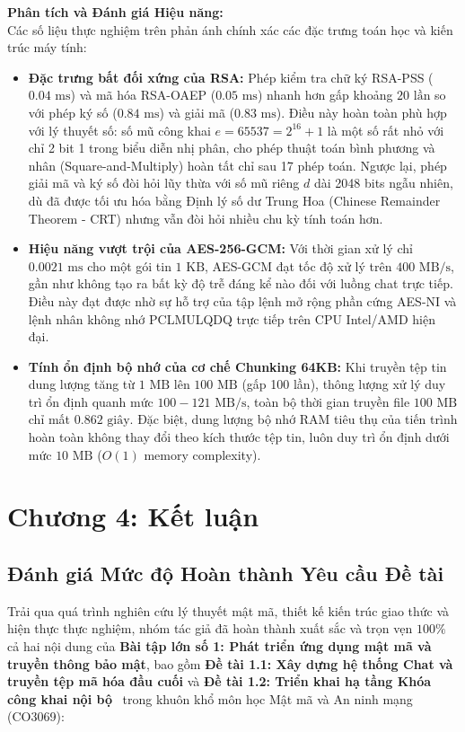 \documentclass[a4paper,12pt]{article}
\begin{document}
\textbf{Phân tích và Đánh giá Hiệu năng:}\\
Các số liệu thực nghiệm trên phản ánh chính xác các đặc trưng toán học và kiến trúc máy tính:
\begin{itemize}
    \item \textbf{Đặc trưng bất đối xứng của RSA:} Phép kiểm tra chữ ký RSA-PSS ($0.04\text{ ms}$) và mã hóa RSA-OAEP ($0.05\text{ ms}$) nhanh hơn gấp khoảng $20\text{ lần}$ so với phép ký số ($0.84\text{ ms}$) và giải mã ($0.83\text{ ms}$). Điều này hoàn toàn phù hợp với lý thuyết số: số mũ công khai $e = 65537 = 2^{16} + 1$ là một số rất nhỏ với chỉ 2 bit 1 trong biểu diễn nhị phân, cho phép thuật toán bình phương và nhân (Square-and-Multiply) hoàn tất chỉ sau 17 phép toán. Ngược lại, phép giải mã và ký số đòi hỏi lũy thừa với số mũ riêng $d$ dài 2048 bits ngẫu nhiên, dù đã được tối ưu hóa bằng Định lý số dư Trung Hoa (Chinese Remainder Theorem - CRT) nhưng vẫn đòi hỏi nhiều chu kỳ tính toán hơn.
    \item \textbf{Hiệu năng vượt trội của AES-256-GCM:} Với thời gian xử lý chỉ $0.0021\text{ ms}$ cho một gói tin $1\text{ KB}$, AES-GCM đạt tốc độ xử lý trên $400\text{ MB/s}$, gần như không tạo ra bất kỳ độ trễ đáng kể nào đối với luồng chat trực tiếp. Điều này đạt được nhờ sự hỗ trợ của tập lệnh mở rộng phần cứng AES-NI và lệnh nhân không nhớ PCLMULQDQ trực tiếp trên CPU Intel/AMD hiện đại.
    \item \textbf{Tính ổn định bộ nhớ của cơ chế Chunking 64KB:} Khi truyền tệp tin dung lượng tăng từ $1\text{ MB}$ lên $100\text{ MB}$ (gấp 100 lần), thông lượng xử lý duy trì ổn định quanh mức $100 - 121\text{ MB/s}$, toàn bộ thời gian truyền file $100\text{ MB}$ chỉ mất $0.862\text{ giây}$. Đặc biệt, dung lượng bộ nhớ RAM tiêu thụ của tiến trình hoàn toàn không thay đổi theo kích thước tệp tin, luôn duy trì ổn định dưới mức $10\text{ MB}$ ($O(1)$ memory complexity).
\end{itemize}

\section{Chương 4: Kết luận}

\subsection{Đánh giá Mức độ Hoàn thành Yêu cầu Đề tài}
Trải qua quá trình nghiên cứu lý thuyết mật mã, thiết kế kiến trúc giao thức và hiện thực thực nghiệm, nhóm tác giả đã hoàn thành xuất sắc và trọn vẹn $100\%$ cả hai nội dung của \textbf{Bài tập lớn số 1: Phát triển ứng dụng mật mã và truyền thông bảo mật}, bao gồm \textbf{Đề tài 1.1: Xây dựng hệ thống Chat và truyền tệp mã hóa đầu cuối} và \textbf{Đề tài 1.2: Triển khai hạ tầng Khóa công khai nội bộ}~\cite{doc_btl} trong khuôn khổ môn học Mật mã và An ninh mạng (CO3069):
\end{document}
